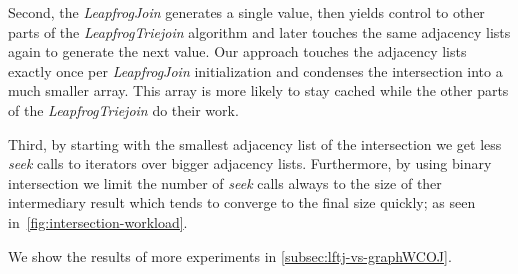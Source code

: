 Second, the \textit{LeapfrogJoin} generates a single value, then yields control to other parts
of the \textit{LeapfrogTriejoin} algorithm and later touches the same adjacency lists again to generate the next value.
Our approach touches the adjacency lists exactly once per \textit{LeapfrogJoin} initialization and
condenses the intersection into a much smaller array.
This array is more likely to stay cached while the other parts of the \textit{LeapfrogTriejoin} do their work.

Third, by starting with the smallest adjacency list of the intersection we get less \textit{seek}
calls to iterators over bigger adjacency lists.
Furthermore, by using binary intersection we limit the number of \textit{seek} calls always to the
size of ther intermediary result which tends to converge to the final size quickly; as seen in~\cref{fig:intersection-workload}.

We show the results of more experiments in \cref{subsec:lftj-vs-graphWCOJ}.